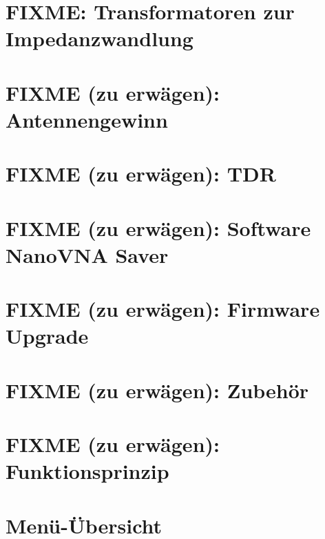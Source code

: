 \documentclass[twoside,a4paper,11pt,halfparskip,DIV=11,notitlepage]{scrartcl}
\begin{document}
\section{FIXME: Transformatoren zur Impedanzwandlung}\label{sec:impedanztrafo}

\section{FIXME (zu erwägen): Antennengewinn}

\section{FIXME (zu erwägen): TDR}

\section{FIXME (zu erwägen): Software NanoVNA Saver}

\section{FIXME (zu erwägen): Firmware Upgrade}

\section{FIXME (zu erwägen): Zubehör}

\section{FIXME (zu erwägen): Funktionsprinzip}




\section{Menü-Übersicht}\label{sec:menu} %

\newpage %
\end{document}
